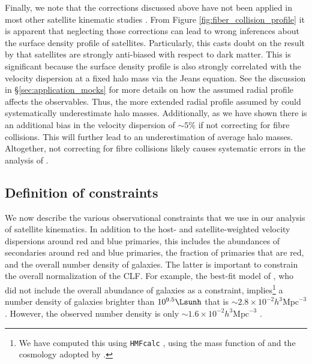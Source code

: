 \documentclass[fleqn,usenatbib,useAMS]{mnras}
\begin{document}
	Finally, we note that the corrections discussed above have not been applied in most other satellite kinematic studies \citep{McKay+02, Prada+03, Brainerd+03, Conroy+07, More+09b, More+11}. From Figure \ref{fig:fiber_collision_profile} it is apparent that neglecting those corrections can lead to wrong inferences about the surface density profile of satellites. Particularly, this casts doubt on the result by \cite{More+09b} that satellites are strongly anti-biased with respect to dark matter. This is significant because the surface density profile is also strongly correlated with the velocity dispersion at a fixed halo mass via the Jeans equation. See the discussion in \S\ref{sec:application_mocks} for more details on how the assumed radial profile affects the observables. Thus, the more extended radial profile assumed by \cite{More+09b, More+11} could systematically underestimate halo masses. Additionally, as we have shown there is an additional bias in the velocity dispersion of $\sim 5\%$ if not correcting for fibre collisions. This will further lead to an underestimation of average halo masses. Altogether, not correcting for fibre collisions likely causes systematic errors in the analysis of \cite{More+09b, More+11}.
	
	\subsection{Definition of constraints}
	\label{subsec:constraints}
	
	We now describe the various observational constraints that we use in our analysis of satellite kinematics. In addition to the host- and satellite-weighted velocity dispersions around red and blue primaries, this includes the abundances of secondaries around red and blue primaries, the fraction of primaries that are red, and the overall number density of galaxies. The latter is important to constrain the overall normalization of the CLF. For example, the best-fit model of \cite{More+11}, who did not include the overall abundance of galaxies as a constraint, implies\footnote{We have computed this using \texttt{HMFcalc} \citep{Murray+13}, using the mass function of \cite{Tinker+08} and the cosmology adopted by \cite{More+11}.} a number density of galaxies brighter than  $10^{9.5} \Lsunh$ that is $\sim 2.8 \times 10^{-2} h^3 \mathrm{Mpc}^{-3}$. However, the observed number density is only $\sim 1.6 \times 10^{-2} h^3 \mathrm{Mpc}^{-3}$ \citep{Zehavi+11, Guo+15b}.
	
\end{document}
